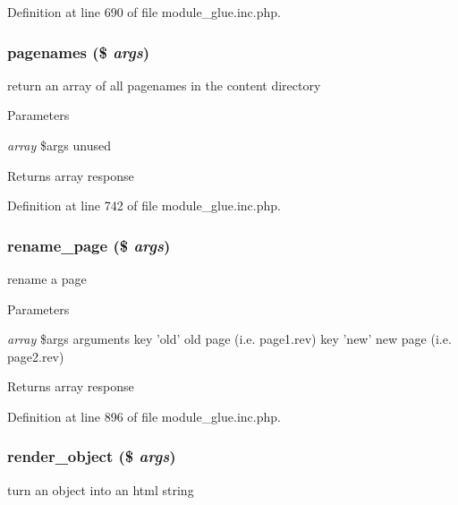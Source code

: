 Definition at line 690 of file module\_\-glue.inc.php.

\hypertarget{module__glue_8inc_8php_a354fc85f928484ae3b316bbf0065d9bd}{
\subsubsection[{pagenames}]{\setlength{\rightskip}{0pt plus 5cm}pagenames (\$ {\em args})}}
\label{module__glue_8inc_8php_a354fc85f928484ae3b316bbf0065d9bd}
return an array of all pagenames in the content directory


\begin{DoxyParams}{Parameters}
\item[{\em array}]\$args unused \end{DoxyParams}
\begin{DoxyReturn}{Returns}
array response 
\end{DoxyReturn}


Definition at line 742 of file module\_\-glue.inc.php.

\hypertarget{module__glue_8inc_8php_acd08b36587528b6f088cafb7d1d6bd29}{
\subsubsection[{rename\_\-page}]{\setlength{\rightskip}{0pt plus 5cm}rename\_\-page (\$ {\em args})}}
\label{module__glue_8inc_8php_acd08b36587528b6f088cafb7d1d6bd29}
rename a page 
\begin{DoxyParams}{Parameters}
\item[{\em array}]\$args arguments key 'old' old page (i.e. page1.rev) key 'new' new page (i.e. page2.rev) \end{DoxyParams}
\begin{DoxyReturn}{Returns}
array response 
\end{DoxyReturn}


Definition at line 896 of file module\_\-glue.inc.php.

\hypertarget{module__glue_8inc_8php_ae9103a74e4b40e88536fbc0a52d1c72f}{
\subsubsection[{render\_\-object}]{\setlength{\rightskip}{0pt plus 5cm}render\_\-object (\$ {\em args})}}
\label{module__glue_8inc_8php_ae9103a74e4b40e88536fbc0a52d1c72f}
turn an object into an html string

